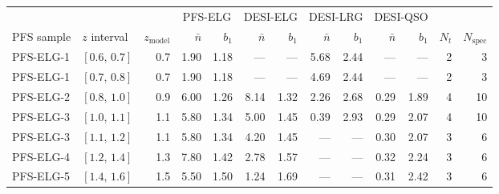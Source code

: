 \documentclass[a4paper,11pt]{article}
\newcommand{\revchange}[1]{{\color{RevisionColor}#1}}
\newcommand{\nbar}{\bar{n}}
\begin{document}
\begin{table}[t]
\centering
\small
\setlength{\tabcolsep}{3pt}
\begin{tabular}{llrrrrrrrrrrr}
\hline
 & & & \multicolumn{2}{c}{PFS-ELG} & \multicolumn{2}{c}{DESI-ELG} & \multicolumn{2}{c}{DESI-LRG} & \multicolumn{2}{c}{DESI-QSO} & & \\
\revchange{PFS sample} & \revchange{$z$ interval} & \revchange{$z_{\mathrm{model}}$} & $\nbar$ & $b_1$ & $\nbar$ & $b_1$ & $\nbar$ & $b_1$ & $\nbar$ & $b_1$ & $N_t$ & $N_{\mathrm{spec}}$ \\
\hline
\revchange{PFS-ELG-1} & \revchange{$[0.6,\,0.7]$} & \revchange{0.7} & \revchange{1.90} & \revchange{1.18} & \revchange{---} & \revchange{---} & \revchange{5.68} & \revchange{2.44} & \revchange{---} & \revchange{---} & \revchange{2} & \revchange{3} \\
\revchange{PFS-ELG-1} & \revchange{$[0.7,\,0.8]$} & \revchange{0.7} & \revchange{1.90} & \revchange{1.18} & \revchange{---} & \revchange{---} & \revchange{4.69} & \revchange{2.44} & \revchange{---} & \revchange{---} & \revchange{2} & \revchange{3} \\
\revchange{PFS-ELG-2} & \revchange{$[0.8,\,1.0]$} & \revchange{0.9} & \revchange{6.00} & \revchange{1.26} & \revchange{8.14} & \revchange{1.32} & \revchange{2.26} & \revchange{2.68} & \revchange{0.29} & \revchange{1.89} & \revchange{4} & \revchange{10} \\
\revchange{PFS-ELG-3} & \revchange{$[1.0,\,1.1]$} & \revchange{1.1} & \revchange{5.80} & \revchange{1.34} & \revchange{5.00} & \revchange{1.45} & \revchange{0.39} & \revchange{2.93} & \revchange{0.29} & \revchange{2.07} & \revchange{4} & \revchange{10} \\
\revchange{PFS-ELG-3} & \revchange{$[1.1,\,1.2]$} & \revchange{1.1} & \revchange{5.80} & \revchange{1.34} & \revchange{4.20} & \revchange{1.45} & \revchange{---} & \revchange{---} & \revchange{0.30} & \revchange{2.07} & \revchange{3} & \revchange{6} \\
\revchange{PFS-ELG-4} & \revchange{$[1.2,\,1.4]$} & \revchange{1.3} & \revchange{7.80} & \revchange{1.42} & \revchange{2.78} & \revchange{1.57} & \revchange{---} & \revchange{---} & \revchange{0.32} & \revchange{2.24} & \revchange{3} & \revchange{6} \\
\revchange{PFS-ELG-5} & \revchange{$[1.4,\,1.6]$} & \revchange{1.5} & \revchange{5.50} & \revchange{1.50} & \revchange{1.24} & \revchange{1.69} & \revchange{---} & \revchange{---} & \revchange{0.31} & \revchange{2.42} & \revchange{3} & \revchange{6} \\

\end{tabular}
\end{table}
\end{document}

